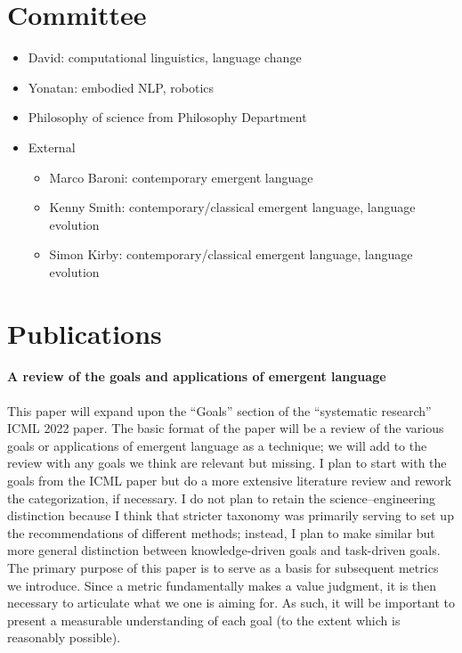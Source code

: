 \section{Committee}
\begin{itemize}
    \item David: computational linguistics, language change
    \item Yonatan: embodied NLP, robotics
    \item {} Philosophy of science from Philosophy Department
    \item {} External
        \begin{itemize}
        \item Marco Baroni: contemporary emergent language
        \item Kenny Smith: contemporary/classical emergent language, language evolution
        \item Simon Kirby: contemporary/classical emergent language, language evolution
        \end{itemize}
\end{itemize}

\section{Publications}



\paragraph{A review of the goals and applications of emergent language}
This paper will expand upon the ``Goals'' section of the ``systematic research'' ICML 2022 paper.
The basic format of the paper will be a review of the various goals or applications of emergent language as a technique; we will add to the review with any goals we think are relevant but missing.
I plan to start with the goals from the ICML paper but do a more extensive literature review and rework the categorization, if necessary.
I do not plan to retain the science--engineering distinction because I think that stricter taxonomy was primarily serving to set up the recommendations of different methods; instead, I plan to make similar but more general distinction between knowledge-driven goals and task-driven goals.
The primary purpose of this paper is to serve as a basis for subsequent metrics we introduce.
Since a metric fundamentally makes a value judgment, it is then necessary to articulate what we one is aiming for.
As such, it will be important to present a measurable understanding of each goal (to the extent which is reasonably possible).

